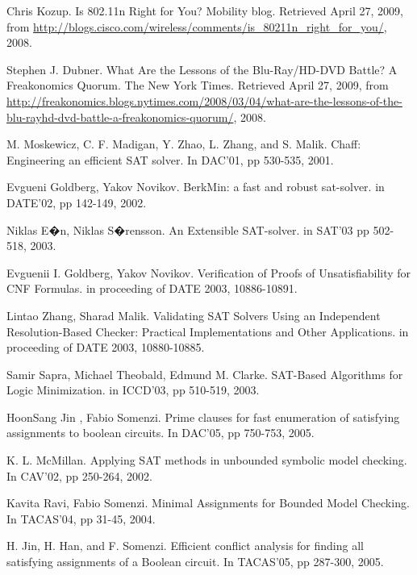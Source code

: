 \documentclass[journal]{IEEEtran}
\begin{document}
\begin{thebibliography}{1}

Chris Kozup.
Is 802.11n Right for You?
Mobility blog.
Retrieved April 27, 2009, from \url{http://blogs.cisco.com/wireless/comments/is_80211n_right_for_you/},
2008.

Stephen J. Dubner.
What Are the Lessons of the Blu-Ray/HD-DVD Battle? A Freakonomics Quorum.
The New York Times.
Retrieved April 27, 2009, from  \url{http://freakonomics.blogs.nytimes.com/2008/03/04/what-are-the-lessons-of-the-blu-rayhd-dvd-battle-a-freakonomics-quorum/},
2008.

M. Moskewicz, C. F. Madigan, Y. Zhao, L. Zhang, and S. Malik.
Chaff: Engineering an efficient SAT solver.
In DAC'01,
pp 530-535,
2001.

Evgueni Goldberg, Yakov Novikov.
BerkMin: a fast and robust sat-solver.
in DATE'02,
pp 142-149,
2002.

Niklas E�n, Niklas S�rensson.
An Extensible SAT-solver.
in SAT'03
pp 502-518,
2003.

Evguenii I. Goldberg, Yakov Novikov.
Verification of Proofs of Unsatisfiability for CNF Formulas.
in proceeding of DATE 2003, 10886-10891.

Lintao Zhang, Sharad Malik.
Validating SAT Solvers Using an Independent Resolution-Based Checker: Practical Implementations and Other Applications.
in proceeding of DATE 2003, 10880-10885.

Samir Sapra, Michael Theobald, Edmund M. Clarke.
SAT-Based Algorithms for Logic Minimization.
in ICCD'03,
pp 510-519,
2003.

HoonSang Jin , Fabio Somenzi.
Prime clauses for fast enumeration of satisfying assignments to boolean circuits.
In DAC'05,
pp 750-753,
2005.


K. L. McMillan.
Applying SAT methods in unbounded symbolic model checking.
In CAV'02,
pp 250-264,
2002.

Kavita Ravi, Fabio Somenzi.
Minimal Assignments for Bounded Model Checking.
In TACAS'04,
pp 31-45,
2004.

H. Jin, H. Han, and F. Somenzi.
Efficient conflict analysis for finding all satisfying assignments of a Boolean circuit.
In TACAS'05,
pp 287-300,
2005.


\end{thebibliography}
\end{document}
